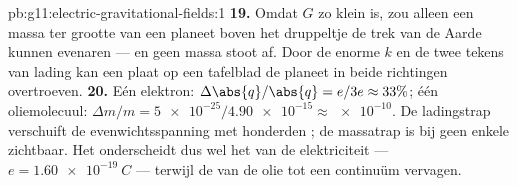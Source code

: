 \begin{solution}{pb:g11:electric-gravitational-fields:1}
\textbf{19.} Omdat $G$ zo klein is, zou alleen een massa ter grootte van
een planeet boven het druppeltje de trek van de Aarde kunnen evenaren ---
en geen massa stoot af. Door de enorme $k$ en de twee tekens van lading
kan een plaat op een tafelblad de planeet in beide richtingen
overtroeven.
\textbf{20.} Eén elektron: $\Delta\abs{q}/\abs{q} = e/3e \approx 33\%$;
één oliemolecuul: $\Delta m/m = \num{5e-25} / \num{4.90e-15}
\approx \num{e-10}$. De ladingstrap verschuift de evenwichtsspanning met
honderden ; de massatrap is bij geen enkele  zichtbaar. Het
 onderscheidt dus wel het  van de elektriciteit ---
$e = \qty{1.60e-19}{C}$ --- terwijl de  van de olie tot een
continuüm vervagen.
\end{solution}
